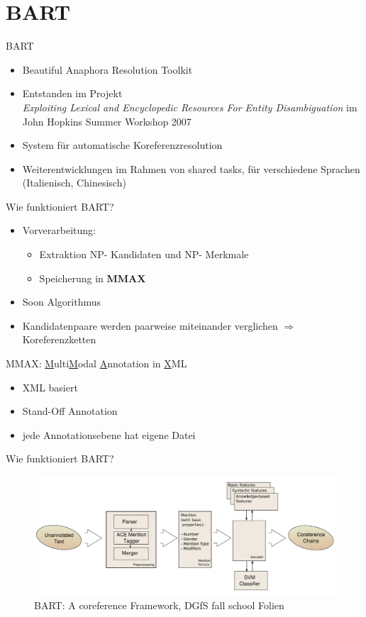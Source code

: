 \documentclass[11pt,a4paper]{beamer}
\begin{document}
\section{BART}
\begin{frame}{BART}
\begin{itemize}
\item Beautiful Anaphora Resolution Toolkit
\item Entstanden im Projekt\\ \textit{Exploiting Lexical and Encyclopedic Resources For Entity Disambiguation} 
im John Hopkins Summer Workshop 2007
\item System für automatische Koreferenzresolution
\item Weiterentwicklungen im Rahmen von shared tasks, für verschiedene Sprachen (Italienisch, Chinesisch)
\end{itemize}
\end{frame}

\begin{frame}{Wie funktioniert BART?}
\begin{itemize}
\item Vorverarbeitung: 
	\begin{itemize}
		\item Extraktion NP- Kandidaten und NP- Merkmale
		\item Speicherung in \bf{MMAX}
	\end{itemize}
\item Soon Algorithmus
\item Kandidatenpaare werden paarweise miteinander verglichen
\newline $\Rightarrow$ Koreferenzketten
\end{itemize}
\end{frame}

\begin{frame}{MMAX: \uline{M}ulti\uline{M}odal \uline{A}nnotation in \uline{X}ML} 
\begin{itemize}


\item XML basiert
\item Stand-Off Annotation
\item jede Annotationsebene hat eigene Datei

\end{itemize}
\end{frame}

\begin{frame}{Wie funktioniert BART?}
\begin{figure}
\includegraphics[scale=0.35]{bart.PNG}
\caption{BART: A coreference Framework, DGfS fall school Folien}
\end{figure}
\end{frame}
\end{document}
